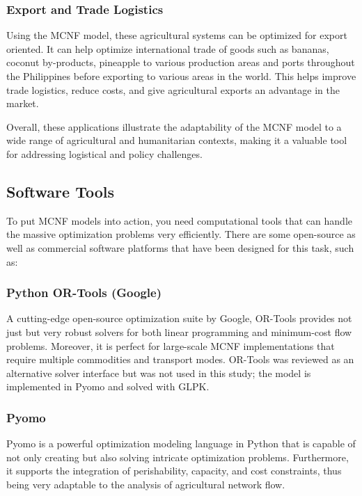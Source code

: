 \documentclass{icsthesis}
\begin{document}
\begin{mainmatter}
\subsubsection{Export and Trade Logistics}
Using the MCNF model, these agricultural systems can be optimized for export oriented. It can help optimize international trade of goods such as bananas, coconut by-products, pineapple to various production areas and ports throughout the Philippines before exporting to various areas in the world. This helps improve trade logistics, reduce costs, and give agricultural exports an advantage in the market.



Overall, these applications illustrate the adaptability of the MCNF model to a wide range of agricultural and humanitarian contexts, making it a valuable tool for addressing logistical and policy challenges.

\subsection{Software Tools}
To put MCNF models into action, you need computational tools that can handle the massive optimization problems very efficiently. There are some open-source as well as commercial software platforms that have been designed for this task, such as:


\subsubsection{Python OR-Tools (Google)}
A cutting-edge open-source optimization suite by Google, OR-Tools provides not just but very robust solvers for both linear programming and minimum-cost flow problems. Moreover, it is perfect for large-scale MCNF implementations that require multiple commodities and transport modes. OR-Tools was reviewed as an alternative solver interface but was not used in this study; the model is implemented in Pyomo and solved with GLPK.


\subsubsection{Pyomo}
Pyomo is a powerful optimization modeling language in Python that is capable of not only creating but also solving intricate optimization problems. Furthermore, it supports the integration of perishability, capacity, and cost constraints, thus being very adaptable to the analysis of agricultural network flow.



\end{mainmatter}
\end{document}
